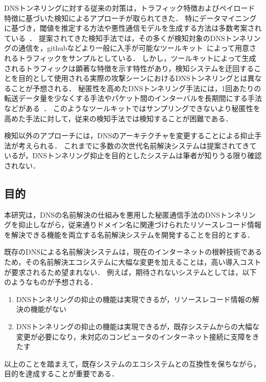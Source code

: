 DNSトンネリングに対する従来の対策は，トラフィック特徴およびペイロード特徴に基づいた検知によるアプローチが取られてきた．
特にデータマイニングに基づき，閾値を推定する方法や悪性通信モデルを生成する方法は多数考案されている~\cite{born, cheng, liu, asaf, steadman, jawad}．
提案されてきた検知手法では，その多くが検知対象のDNSトンネリングの通信を，githubなどより一般に入手が可能なツールキット~\cite{ozymandns, iodine, dnscat2}によって用意されるトラフィックをサンプルとしている．
しかし，ツールキットによって生成されるトラフィックは顕著な特徴を示す特性があり，検知システムを迂回することを目的として使用される実際の攻撃シーンにおけるDNSトンネリングとは異なることが予想される．
秘匿性を高めたDNSトンネリング手法には，1回あたりの転送データ量を少なくする手法やパケット間のインターバルを長期間にする手法などがある~\cite{asaf}．
このようなツールキットではサンプリングできないより秘匿性を高めた手法に対して，従来の検知手法では検知することが困難である．

検知以外のアプローチには，DNSのアーキテクチャを変更することによる抑止手法が考えられる．
これまでに多数の次世代名前解決システムは提案されてきているが，DNSトンネリング抑止を目的としたシステムは筆者が知りうる限り確認されない．


\subsection{目的}
本研究は，DNSの名前解決の仕組みを悪用した秘匿通信手法のDNSトンネリングを抑止しながら，従来通りドメイン名に関連づけられたリソースレコード情報を解決できる機能を両立する名前解決システムを開発することを目的とする．

既存のDNSによる名前解決システムは，現在のインターネットの根幹技術であるため，その名前解決エコシステムに大幅な変更を加えることは，高い導入コストが要求されるため望まれない．
例えば，期待されないシステムとしては，以下のようなものが予想される．
\begin{enumerate}
 \setlength{\itemsep}{-0.5mm}
 \item DNSトンネリングの抑止の機能は実現できるが，リソースレコード情報の解決の機能がない
 \item DNSトンネリングの抑止の機能は実現できるが，既存システムからの大幅な変更が必要になり，未対応のコンピュータのインターネット接続に支障をきたす
\end{enumerate}
以上のことを踏まえて，既存システムのエコシステムとの互換性を保ちながら，目的を達成することが重要である．

